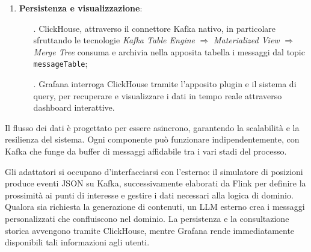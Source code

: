 \documentclass[10pt]{article}
\begin{document}
\begin{enumerate}
        \item \textbf{Persistenza e visualizzazione}:
        \begin{itemize}
            \item[.] ClickHouse, attraverso il connettore Kafka nativo, in particolare sfruttando le tecnologie \textit{Kafka Table Engine} $\Rightarrow$ \textit{Materialized View} $\Rightarrow$ \textit{Merge Tree} consuma e archivia nella apposita tabella i messaggi dal topic \texttt{messageTable};
            \item[.] Grafana interroga ClickHouse tramite l'apposito plugin e il sistema di query, per recuperare e visualizzare i dati in tempo reale attraverso dashboard interattive.
        \end{itemize}
    \end{enumerate}

    Il flusso dei dati è progettato per essere asincrono, garantendo la scalabilità e la resilienza del sistema. Ogni componente può funzionare indipendentemente, con Kafka che funge da buffer di messaggi affidabile tra i vari stadi del processo.

    Gli adattatori si occupano d'interfacciarsi con l'esterno: il simulatore di posizioni produce eventi JSON su Kafka, successivamente elaborati da Flink per definire la prossimità ai punti di interesse e gestire i dati necessari alla logica di dominio. Qualora sia richiesta la generazione di contenuti, un LLM esterno crea i messaggi personalizzati che confluiscono nel dominio. La persistenza e la consultazione storica avvengono tramite ClickHouse, mentre Grafana rende immediatamente disponibili tali informazioni agli utenti.
\end{document}

